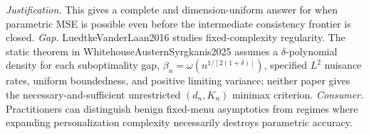 \documentclass{article}
\begin{document}
\par\smallskip\noindent \textit{Justification.} This gives a complete and dimension-uniform answer for when parametric MSE is possible even before the intermediate consistency frontier is closed. \textit{Gap.} LuedtkeVanderLaan2016 studies fixed-complexity regularity. The static theorem in WhitehouseAusternSyrgkanis2025 assumes a \(\delta\)-polynomial density for each suboptimality gap, \(\beta_n=\omega(n^{1/[2(1+\delta)]})\), specified \(L^2\) nuisance rates, uniform boundedness, and positive limiting variance; neither paper gives the necessary-and-sufficient unrestricted \((d_n,K_n)\) minimax criterion. \textit{Consumer.} Practitioners can distinguish benign fixed-menu asymptotics from regimes where expanding personalization complexity necessarily destroys parametric accuracy.
\end{document}
